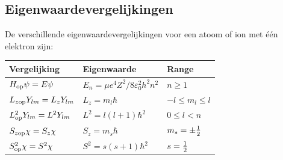 \documentclass[twoside]{report}
\begin{document}
\subsection[~~Eigenwaardevergelijkingen]{Eigenwaardevergelijkingen}
De verschillende eigenwaardevergelijkingen voor een atoom of ion met \'e\'en
elektron zijn:
\begin{center}
\begin{tabular}{||l|l|l||}
\hline
{\bf Vergelijking}&{\bf Eigenwaarde}&{\bf Range}\\
\hline
\hline
$H_{\rm op}\psi=E\psi$        &$E_n=\mu e^4Z^2/8\varepsilon_0^2h^2n^2$&$n\geq1$\rule{0pt}{14pt}\\
$L_{z\rm op}Y_{lm}=L_zY_{lm}$ &$L_z=m_l\hbar$     &$-l\leq m_l\leq l$\rule{0pt}{14pt}\\
$L^2_{\rm op}Y_{lm}=L^2Y_{lm}$&$L^2=l(l+1)\hbar^2$&$0\leq l<n$\rule{0pt}{14pt}\\
$S_{z\rm op}\chi=S_z\chi$     &$S_z=m_s\hbar$     &$m_s=\pm\mbox{$\frac{1}{2}$}$\rule{0pt}{14pt}\\
$S^2_{\rm op}\chi=S^2\chi$    &$S^2=s(s+1)\hbar^2$&$s=\mbox{$\frac{1}{2}$}$\rule[-5pt]{0pt}{19pt}\\
\hline
\end{tabular}
\end{center}
\end{document}
